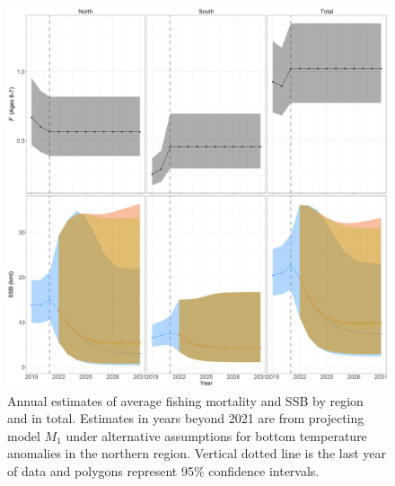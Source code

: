 \documentclass[
]{article}
\begin{document}
\begin{figure}

{\centering \includegraphics[height=0.95\textheight]{proj_F_SSB} 

}

\caption{Annual estimates of average fishing mortality and SSB by region and in total. Estimates in years beyond 2021 are from projecting model $M_1$ under alternative assumptions for bottom temperature anomalies in the northern region. Vertical dotted line is the last year of data and polygons represent 95\% confidence intervals.}\label{fig:F-SSB-proj}
\end{figure}
\end{document}

